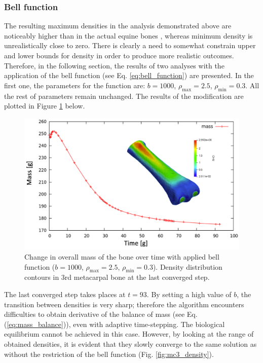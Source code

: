 \documentclass[11pt]{acmeArticle}
\numberwithin{equation}{section}
\begin{document}
\subsubsection{Bell function}
\label{sec:bell}
The resulting maximum densities in the analysis demonstrated above are noticeably higher than in the actual equine bones \citep{yamada2015experimental}, whereas minimum density is unrealistically close to zero. There is clearly a need to somewhat constrain upper and lower bounds for density in order to produce more realistic outcomes.
Therefore, in the following section, the results of two analyses with the application of the bell function (see Eq. \ref{eq:bell_function}) are presented. In the first one, the parameters for the function are: $b = 1000$, $\rho_\mathrm{max} = 2.5$, $\rho_\mathrm{min} = 0.3$. All the rest of parameters remain unchanged. The results of the modification are plotted in Figure \ref{fig:density_bell1} below.
\begin{figure}[h!]
	\begin{centering}
		\includegraphics[width=15cm]{Figures/graphs/density_bell1.png}
		\caption{Change in overall mass of the bone over time with applied bell function ($b = 1000$, $\rho_\mathrm{max} = 2.5$, $\rho_\mathrm{min} = 0.3$). Density distribution contours in 3rd metacarpal bone at the last converged step.}
		\label{fig:density_bell1}
	\end{centering}
\end{figure}
The last converged step takes places at $t=93$. By setting a high value of $b$, the transition between densities is very sharp; therefore the algorithm encounters difficulties to obtain derivative of the balance of mass (see Eq. (\ref{eq:mass_balance})), even with adaptive time-stepping. The biological equilibrium cannot be achieved in this case. However, by looking at the range of obtained densities, it is evident that they slowly converge to the same solution as without the restriction of the bell function (Fig. \ref{fig:mc3_density}). 
\end{document}

